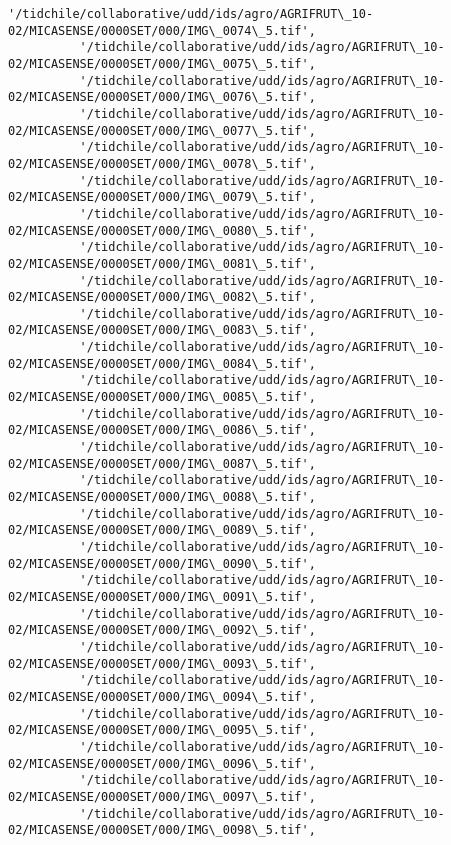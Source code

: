 \documentclass[11pt]{article}
\begin{document}
\begin{Verbatim}[commandchars=\\\{\}]
          '/tidchile/collaborative/udd/ids/agro/AGRIFRUT\_10-02/MICASENSE/0000SET/000/IMG\_0074\_5.tif',
          '/tidchile/collaborative/udd/ids/agro/AGRIFRUT\_10-02/MICASENSE/0000SET/000/IMG\_0075\_5.tif',
          '/tidchile/collaborative/udd/ids/agro/AGRIFRUT\_10-02/MICASENSE/0000SET/000/IMG\_0076\_5.tif',
          '/tidchile/collaborative/udd/ids/agro/AGRIFRUT\_10-02/MICASENSE/0000SET/000/IMG\_0077\_5.tif',
          '/tidchile/collaborative/udd/ids/agro/AGRIFRUT\_10-02/MICASENSE/0000SET/000/IMG\_0078\_5.tif',
          '/tidchile/collaborative/udd/ids/agro/AGRIFRUT\_10-02/MICASENSE/0000SET/000/IMG\_0079\_5.tif',
          '/tidchile/collaborative/udd/ids/agro/AGRIFRUT\_10-02/MICASENSE/0000SET/000/IMG\_0080\_5.tif',
          '/tidchile/collaborative/udd/ids/agro/AGRIFRUT\_10-02/MICASENSE/0000SET/000/IMG\_0081\_5.tif',
          '/tidchile/collaborative/udd/ids/agro/AGRIFRUT\_10-02/MICASENSE/0000SET/000/IMG\_0082\_5.tif',
          '/tidchile/collaborative/udd/ids/agro/AGRIFRUT\_10-02/MICASENSE/0000SET/000/IMG\_0083\_5.tif',
          '/tidchile/collaborative/udd/ids/agro/AGRIFRUT\_10-02/MICASENSE/0000SET/000/IMG\_0084\_5.tif',
          '/tidchile/collaborative/udd/ids/agro/AGRIFRUT\_10-02/MICASENSE/0000SET/000/IMG\_0085\_5.tif',
          '/tidchile/collaborative/udd/ids/agro/AGRIFRUT\_10-02/MICASENSE/0000SET/000/IMG\_0086\_5.tif',
          '/tidchile/collaborative/udd/ids/agro/AGRIFRUT\_10-02/MICASENSE/0000SET/000/IMG\_0087\_5.tif',
          '/tidchile/collaborative/udd/ids/agro/AGRIFRUT\_10-02/MICASENSE/0000SET/000/IMG\_0088\_5.tif',
          '/tidchile/collaborative/udd/ids/agro/AGRIFRUT\_10-02/MICASENSE/0000SET/000/IMG\_0089\_5.tif',
          '/tidchile/collaborative/udd/ids/agro/AGRIFRUT\_10-02/MICASENSE/0000SET/000/IMG\_0090\_5.tif',
          '/tidchile/collaborative/udd/ids/agro/AGRIFRUT\_10-02/MICASENSE/0000SET/000/IMG\_0091\_5.tif',
          '/tidchile/collaborative/udd/ids/agro/AGRIFRUT\_10-02/MICASENSE/0000SET/000/IMG\_0092\_5.tif',
          '/tidchile/collaborative/udd/ids/agro/AGRIFRUT\_10-02/MICASENSE/0000SET/000/IMG\_0093\_5.tif',
          '/tidchile/collaborative/udd/ids/agro/AGRIFRUT\_10-02/MICASENSE/0000SET/000/IMG\_0094\_5.tif',
          '/tidchile/collaborative/udd/ids/agro/AGRIFRUT\_10-02/MICASENSE/0000SET/000/IMG\_0095\_5.tif',
          '/tidchile/collaborative/udd/ids/agro/AGRIFRUT\_10-02/MICASENSE/0000SET/000/IMG\_0096\_5.tif',
          '/tidchile/collaborative/udd/ids/agro/AGRIFRUT\_10-02/MICASENSE/0000SET/000/IMG\_0097\_5.tif',
          '/tidchile/collaborative/udd/ids/agro/AGRIFRUT\_10-02/MICASENSE/0000SET/000/IMG\_0098\_5.tif',

\end{Verbatim}
\end{document}
